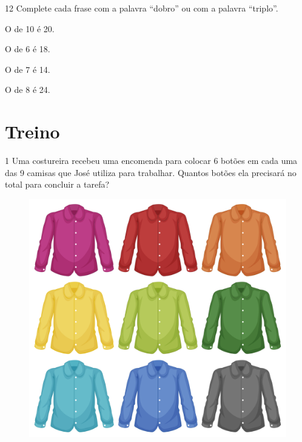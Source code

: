 \num{12} Complete cada frase com a palavra ``dobro'' ou com a palavra ``triplo''.

\begin{escolha}
\item
  O  de 10 é 20.
\item
  O  de 6 é 18.
\item
  O  de 7 é 14.
\item
  O  de 8 é 24.
\end{escolha}

\pagebreak

\section*{Treino}

\num{1} Uma costureira recebeu uma encomenda para colocar 6 botões em
cada uma das 9 camisas que José utiliza para trabalhar. Quantos botões
ela precisará no total para concluir a tarefa?

\begin{figure}[htpb!]
\centering
\includegraphics[width=.8\textwidth]{./media/image16d.jpeg}
\end{figure}

